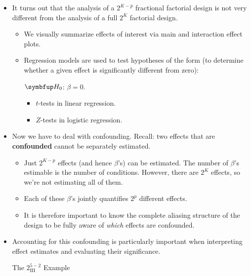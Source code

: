 \begin{itemize}
    \item It turns out that the analysis of a $ 2^{K-p} $ fractional factorial design is not very different from the analysis
          of a full $2^K$ factorial design.
          \begin{itemize}
              \item We visually summarize effects of interest via main and interaction effect plots.
              \item Regression models are used to test hypotheses of the form (to determine whether a given effect is significantly different from zero):
                    \begin{tightcenter}
                        $ \HN $: $ \beta=0 $.
                    \end{tightcenter}
                    \begin{itemize}[$\rightarrow$]
                        \item $ t $-tests in linear regression.
                        \item $ Z $-tests in logistic regression.
                    \end{itemize}
          \end{itemize}
    \item Now we have to deal with confounding. Recall: two effects that are \textbf{confounded} cannot be separately
          estimated.
          \begin{itemize}[$\rightarrow$]
              \item Just $ 2^{K-p} $ effects (and hence $ \beta $'s) can be estimated. The number of $ \beta $'s estimable is the number of conditions.
                    However, there are $ 2^K $ effects, so we're not estimating all of them.
              \item Each of these $ \beta $'s jointly quantifies $ 2^p $ different effects.
          \end{itemize}
          \begin{itemize}
              \item It is therefore important to know the complete aliasing structure of the design to be fully
                    aware of \emph{which} effects are confounded.
          \end{itemize}
    \item Accounting for this confounding is particularly important when interpreting effect estimates and evaluating their significance.
          \begin{Example}{The $ 2^{5-2}_{\text{III}} $ Example}{}

\end{Example}
\end{itemize}
